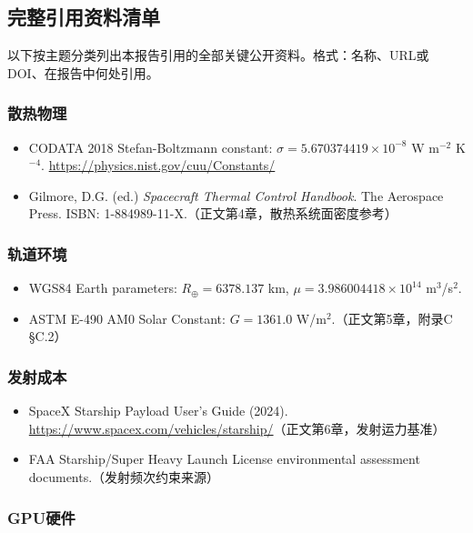 \begingroup
\small
\sloppy
\subsection{完整引用资料清单}
\label{sec:full-references}

以下按主题分类列出本报告引用的全部关键公开资料。格式：名称、URL或DOI、在报告中何处引用。

\subsubsection{散热物理}

\begin{itemize}
  \item CODATA 2018 Stefan-Boltzmann constant: $\sigma = 5.670374419 \times 10^{-8}$ W m$^{-2}$ K$^{-4}$. \url{https://physics.nist.gov/cuu/Constants/}
  \item Gilmore, D.G. (ed.) \textit{Spacecraft Thermal Control Handbook}. The Aerospace Press. ISBN: 1-884989-11-X.（正文第4章，散热系统面密度参考）
\end{itemize}

\subsubsection{轨道环境}

\begin{itemize}
  \item WGS84 Earth parameters: $R_{\oplus} = 6378.137$ km, $\mu = 3.986004418 \times 10^{14}$ m$^3$/s$^2$.
  \item ASTM E-490 AM0 Solar Constant: $G = 1361.0$ W/m$^2$.（正文第5章，附录C §C.2）
\end{itemize}

\subsubsection{发射成本}

\begin{itemize}
  \item SpaceX Starship Payload User's Guide (2024). \url{https://www.spacex.com/vehicles/starship/}（正文第6章，发射运力基准）
  \item FAA Starship/Super Heavy Launch License environmental assessment documents.（发射频次约束来源）
\end{itemize}

\subsubsection{GPU硬件}

